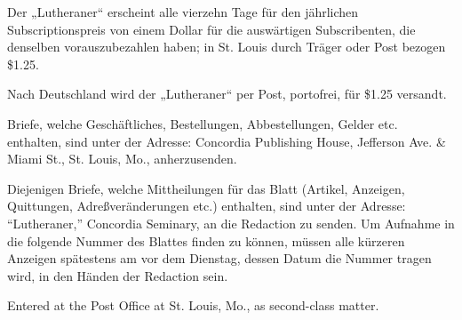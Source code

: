 Der „Lutheraner“ erscheint alle vierzehn Tage für den jährlichen Subscriptionspreis von einem Dollar für die auswärtigen Subscribenten, die denselben vorauszubezahlen haben; in St. Louis durch Träger oder Post bezogen \$1.25.

Nach Deutschland wird der „Lutheraner“ per Post, portofrei, für \$1.25 versandt.

Briefe, welche Geschäftliches, Bestellungen, Abbestellungen, Gelder etc. enthalten, sind unter der Adresse: Concordia Publishing House, Jefferson Ave. \& Miami St., St. Louis, Mo., anherzusenden.

Diejenigen Briefe, welche Mittheilungen für das Blatt (Artikel, Anzeigen, Quittungen, Adreßveränderungen etc.) enthalten, sind unter der Adresse: “Lutheraner,” Concordia Seminary, an die Redaction zu senden. Um Aufnahme in die folgende Nummer des Blattes finden zu können, müssen alle kürzeren Anzeigen spätestens am  vor dem Dienstag, dessen Datum die Nummer tragen wird, in den Händen der Redaction sein.

Entered at the Post Office at St. Louis, Mo., as second-class matter.
